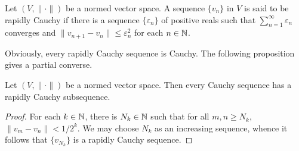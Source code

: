 \begin{definition}
    Let $(V,\|\cdot\|)$ be a normed vector space. A sequence $\{v_n\}$ in $V$ is said to be rapidly Cauchy if there is a sequence $\{\varepsilon_n\}$ of positive reals such that $\sum\limits_{n = 1}^\infty\varepsilon_n$ converges and $\|v_{n + 1} - v_n\|\le\varepsilon_n^2$ for each $n\in\mathbb{N}$.
\end{definition}

Obviously, every rapidly Cauchy sequence is Cauchy. The following proposition gives a partial converse.

\begin{proposition}
    Let $(V,\|\cdot\|)$ be a normed vector space. Then every Cauchy sequence has a rapidly Cauchy subsequence.
\end{proposition}
\begin{proof}
    For each $k\in\mathbb{N}$, there is $N_k\in\mathbb{N}$ such that for all $m,n\ge N_k$, $\|v_m - v_n\| < 1/2^k$. We may choose $N_k$ as an increasing sequence, whence it follows that $\{v_{N_k}\}$ is a rapidly Cauchy sequence.
\end{proof}

